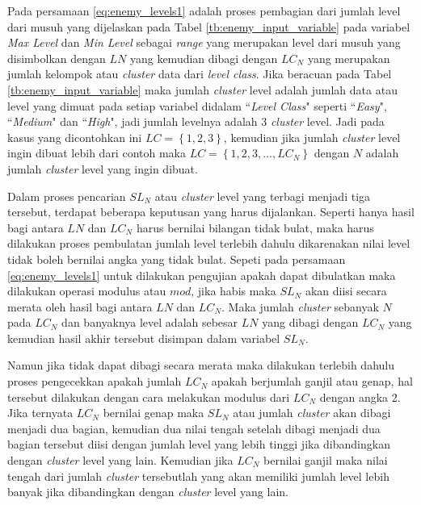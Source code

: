 Pada persamaan \ref{eq:enemy_levels1} adalah proses pembagian dari jumlah level dari musuh yang dijelaskan pada Tabel \ref{tb:enemy_input_variable} pada variabel \textit{Max Level} dan \textit{Min Level} sebagai \textit{range} yang merupakan level dari musuh yang disimbolkan dengan $LN$ yang kemudian dibagi dengan  $LC_{N}$ yang merupakan jumlah kelompok atau \textit{cluster} data dari \textit{level class}. Jika beracuan pada Tabel \ref{tb:enemy_input_variable} maka jumlah \textit{cluster} level adalah jumlah data atau level yang dimuat pada setiap variabel didalam ``\textit{Level Class}" seperti ``\textit{Easy}", ``\textit{Medium}" dan ``\textit{High}", jadi jumlah levelnya adalah 3 \textit{cluster} level. Jadi pada kasus yang dicontohkan ini $LC = \left \{1, 2, 3 \right \}$, kemudian jika jumlah \textit{cluster} level ingin dibuat lebih dari contoh maka $LC = \left \{1, 2, 3,..., LC_{N} \right \}$ dengan $N$ adalah jumlah \textit{cluster} level yang ingin dibuat.
\vspace{1ex}

Dalam proses pencarian $SL_{N}$ atau \textit{cluster} level yang terbagi menjadi tiga tersebut, terdapat beberapa keputusan yang harus dijalankan. Seperti hanya hasil bagi antara $LN$ dan $LC_{N}$ harus bernilai bilangan tidak bulat, maka harus dilakukan proses pembulatan jumlah level terlebih dahulu dikarenakan nilai level tidak boleh bernilai angka yang tidak bulat. Sepeti pada persamaan \ref{eq:enemy_levels1} untuk dilakukan pengujian apakah dapat dibulatkan maka dilakukan operasi modulus atau $mod$, jika habis maka $SL_{N}$ akan diisi secara merata oleh hasil bagi antara $LN$ dan $LC_{N}$. Maka jumlah \textit{cluster} sebanyak $N$ pada $LC_{N}$ dan banyaknya level adalah sebesar $LN$ yang dibagi dengan $LC_{N}$ yang kemudian hasil akhir tersebut disimpan dalam variabel $SL_{N}$. 
\vspace{1ex}

Namun jika tidak dapat dibagi secara merata maka dilakukan terlebih dahulu proses pengecekkan apakah jumlah $LC_{N}$ apakah berjumlah ganjil atau genap, hal tersebut dilakukan dengan cara melakukan modulus dari $LC_{N}$ dengan angka 2. Jika ternyata $LC_{N}$ bernilai genap maka $SL_{N}$ atau jumlah \textit{cluster} akan dibagi menjadi dua bagian, kemudian dua nilai tengah setelah dibagi menjadi dua bagian tersebut diisi dengan jumlah level yang lebih tinggi jika dibandingkan dengan \textit{cluster} level yang lain. Kemudian jika $LC_{N}$ bernilai ganjil maka nilai tengah dari jumlah \textit{cluster} tersebutlah yang akan memiliki jumlah level lebih banyak jika dibandingkan dengan \textit{cluster} level yang lain.
\vspace{1ex}

